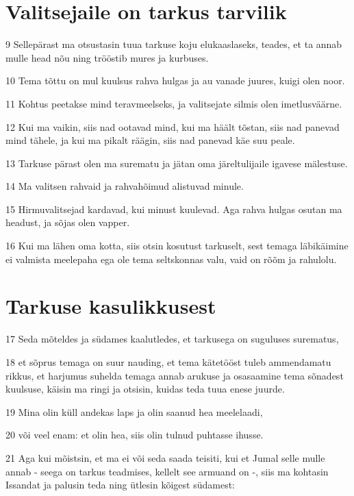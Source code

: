 \section*{Valitsejaile on tarkus tarvilik}

\par 9 Sellepärast ma otsustasin tuua tarkuse koju elukaaslaseks, teades, et ta annab mulle head nõu ning trööstib mures ja kurbuses.
\par 10 Tema tõttu on mul kuulsus rahva hulgas ja au vanade juures, kuigi olen noor.
\par 11 Kohtus peetakse mind teravmeelseks, ja valitsejate silmis olen imetlusväärne.
\par 12 Kui ma vaikin, siis nad ootavad mind, kui ma häält tõstan, siis nad panevad mind tähele, ja kui ma pikalt räägin, siis nad panevad käe suu peale.
\par 13 Tarkuse pärast olen ma surematu ja jätan oma järeltulijaile igavese mälestuse.
\par 14 Ma valitsen rahvaid ja rahvahõimud alistuvad minule.
\par 15 Hirmuvalitsejad kardavad, kui minust kuulevad. Aga rahva hulgas osutan ma headust, ja sõjas olen vapper.
\par 16 Kui ma lähen oma kotta, siis otsin kosutust tarkuselt, sest temaga läbikäimine ei valmista meelepaha ega ole tema seltskonnas valu, vaid on rõõm ja rahulolu.

\section*{Tarkuse kasulikkusest}

\par 17 Seda mõteldes ja südames kaalutledes, et tarkusega on suguluses surematus,
\par 18 et sõprus temaga on suur nauding, et tema kätetööst tuleb ammendamatu rikkus, et harjumus suhelda temaga annab arukuse ja osasaamine tema sõnadest kuulsuse, käisin ma ringi ja otsisin, kuidas teda tuua enese juurde.
\par 19 Mina olin küll andekas laps ja olin saanud hea meelelaadi,
\par 20 või veel enam: et olin hea, siis olin tulnud puhtasse ihusse.
\par 21 Aga kui mõistsin, et ma ei või seda saada teisiti, kui et Jumal selle mulle annab - seega on tarkus teadmises, kellelt see armuand on -, siis ma kohtasin Issandat ja palusin teda ning ütlesin kõigest südamest: 

